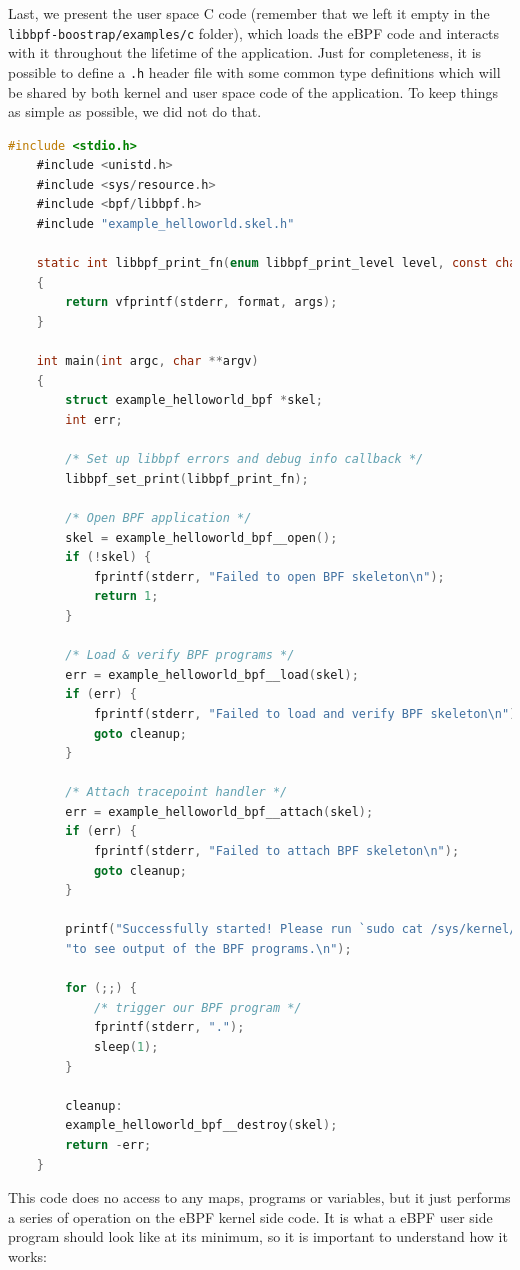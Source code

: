 Last, we present the user space C code (remember that we left it empty in the \colorbox{backcolour}{\lstinline[style=commandline, language=bash, breaklines=true]|libbpf-boostrap/examples/c|} folder), which loads the eBPF code and interacts with it throughout the lifetime of the application.
Just for completeness, it is possible to define a \colorbox{backcolour}{\lstinline[style=commandline, language=bash, breaklines=true]|.h|} header file with some common type definitions which will be shared by both kernel and user space code of the application.
To keep things as simple as possible, we did not do that.

\begin{lstlisting}[style=cstyle, language=C, caption={Code of the ``Hello world!''-like user side program in libbpf-bootstrap.}, title=example\_helloworld.c]
	#include <stdio.h>
	#include <unistd.h>
	#include <sys/resource.h>
	#include <bpf/libbpf.h>
	#include "example_helloworld.skel.h"
	
	static int libbpf_print_fn(enum libbpf_print_level level, const char *format, va_list args)
	{
		return vfprintf(stderr, format, args);
	}
	
	int main(int argc, char **argv)
	{
		struct example_helloworld_bpf *skel;
		int err;
		
		/* Set up libbpf errors and debug info callback */
		libbpf_set_print(libbpf_print_fn);
		
		/* Open BPF application */
		skel = example_helloworld_bpf__open();
		if (!skel) {
			fprintf(stderr, "Failed to open BPF skeleton\n");
			return 1;
		}   
		
		/* Load & verify BPF programs */
		err = example_helloworld_bpf__load(skel);
		if (err) {
			fprintf(stderr, "Failed to load and verify BPF skeleton\n");
			goto cleanup;
		}
		
		/* Attach tracepoint handler */
		err = example_helloworld_bpf__attach(skel);
		if (err) {
			fprintf(stderr, "Failed to attach BPF skeleton\n");
			goto cleanup;
		}
		
		printf("Successfully started! Please run `sudo cat /sys/kernel/debug/tracing/trace_pipe` "
		"to see output of the BPF programs.\n");
		
		for (;;) {
			/* trigger our BPF program */
			fprintf(stderr, ".");
			sleep(1);
		}
		
		cleanup:
		example_helloworld_bpf__destroy(skel);
		return -err;
	}
\end{lstlisting}

This code does no access to any maps, programs or variables, but it just performs a series of operation on the eBPF kernel side code.
It is what a eBPF user side program should look like at its minimum, so it is important to understand how it works:

